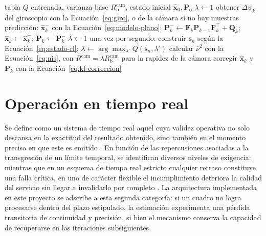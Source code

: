 \begin{algorithm}[H]
\caption[Filtro de Kalman extendido con el peso de la cámara ajustado por una política]{Filtro de Kalman extendido con el peso de la rapidez de la cámara ajustado por una política. Fuente: elaboración propia con base en~\cite{gao2020rlakf,groves2013gnss}.}
\label{alg:ekf-rl}
\begin{algorithmic}[1]
\REQUIRE tabla $Q$ entrenada, varianza base $R^{\mathrm{cam}}_{\mathrm{b}}$, estado inicial $\hat{\mathbf{x}}_0, \mathbf{P}_0$
\STATE $\lambda \leftarrow 1$
  \STATE obtener $\Delta\psi_k$ del giroscopio con la Ecuación~\eqref{eq:giro}, o de la cámara si no hay muestras
  \STATE predicción: $\hat{\mathbf{x}}_k^{-}$ con la Ecuación~\eqref{eq:modelo-plano}; \; $\mathbf{P}_k^{-} \leftarrow \mathbf{F}_k\mathbf{P}_{k-1}\mathbf{F}_k^{\top} + \mathbf{Q}_k$; \; $\hat{\mathbf{x}}_k \leftarrow \hat{\mathbf{x}}_k^{-}$; \; $\mathbf{P}_k \leftarrow \mathbf{P}_k^{-}$
    \STATE $\lambda \leftarrow 1$
  \ELSE
    \STATE una vez por segundo: construir $\mathbf{s}_n$ según la Ecuación~\eqref{eq:estado-rl}; \; $\lambda \leftarrow \arg\max_{\lambda'} Q(\mathbf{s}_n, \lambda')$
  \ENDIF
    \STATE calcular $\bar{\nu}^{2}$ con la Ecuación~\eqref{eq:nis}, con $R^{\mathrm{cam}} = \lambda R^{\mathrm{cam}}_{\mathrm{b}}$ para la rapidez de la cámara
      \STATE corregir $\hat{\mathbf{x}}_k$ y $\mathbf{P}_k$ con la Ecuación~\eqref{eq:kf-correccion}
    \ENDIF
  \ENDFOR
\ENDFOR
\end{algorithmic}
\end{algorithm}

\section{Operación en tiempo real}
\label{sec:tiempo-real}

Se define como un sistema de tiempo real aquel cuya validez operativa no solo descansa en la exactitud del resultado obtenido, sino también en el momento preciso en que este es emitido \cite{buttazzo2011realtime}.
En función de las repercusiones asociadas a la transgresión de un límite temporal, se identifican diversos niveles de exigencia: mientras que en un esquema de tiempo real estricto cualquier retraso constituye una falla crítica, en uno de carácter flexible el incumplimiento deteriora la calidad del servicio sin llegar a invalidarlo por completo \cite{buttazzo2011realtime}.
La arquitectura implementada en este proyecto se adscribe a esta segunda categoría: si un cuadro no logra procesarse dentro del plazo estipulado, la estimación experimenta una pérdida transitoria de continuidad y precisión, si bien el mecanismo conserva la capacidad de recuperarse en las iteraciones subsiguientes.

